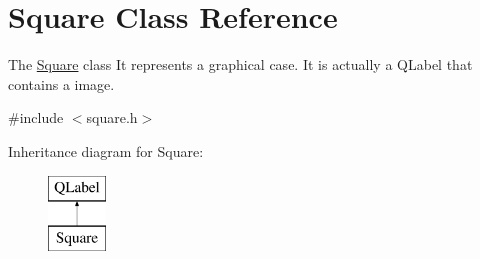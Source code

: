 \hypertarget{class_square}{}\section{Square Class Reference}
\label{class_square}


The \hyperlink{class_square}{Square} class It represents a graphical case. It is actually a Q\+Label that contains a image.  




{\ttfamily \#include $<$square.\+h$>$}

Inheritance diagram for Square\+:\begin{figure}[H]
\begin{center}
\leavevmode
\includegraphics[height=2.000000cm]{class_square}
\end{center}
\end{figure}
